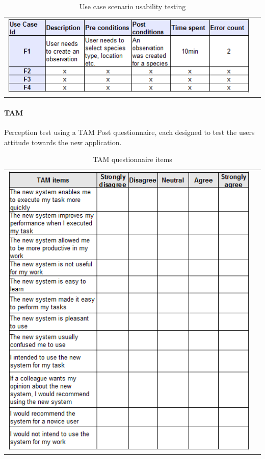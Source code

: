 \begin{table}[h]
        \caption{Use case scenario usability testing\cite{tam:doc5}}
        \centering
        \begin{tabular}{cc}
        \includegraphics[scale=0.91]{reqspec/usabilitytable.png}
        \end{tabular}
        \label{tab:usecaseusability}
    \end{table}


\newpage
\paragraph{TAM}
Perception test using a TAM Post questionnaire\cite{tam:doc4, tam:doc6}, each designed to test the users attitude towards the new application.
    \begin{table}[!htb]
        \caption{TAM questionnaire items}
        \centering
        \begin{tabular}{cc}
        \includegraphics[scale=0.97]{reqspec/tamtable.png}
        \end{tabular}
        \label{tab:tam}
    \end{table}
\newpage

